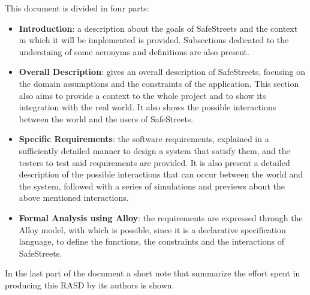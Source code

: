 This document is divided in four parts:
\begin{itemize}
	\item \textbf{Introduction}: a description about the goals of SafeStreets and the context in which it will be implemented is provided. Subsections dedicated to the understaing of some acronyms and definitions are also present. 
	
	\item \textbf{Overall Description}: gives an overall description of SafeStreets, focusing on the domain assumptions and the constraints of the application. This section also aims to provide a context to the whole project and to show its integration with the real world. It also shows the possible interactions between the world and the users of SafeStreets. 
	
	\item \textbf{Specific Requirements}: the software requirements, explained in a sufficiently detailed manner to design a system that satisfy them, and the testers to test said requirements are provided. It is also present a detailed description of the possible interactions that can occur between the world and the system, followed with a series of simulations and previews about the above mentioned interactions.
	
	\item \textbf{Formal Analysis using Alloy}: the requirements are expressed through the Alloy model, with which is possible, since it is a declarative specification language, to define the functions, the constraints and the interactions of SafeStreets.   
\end{itemize}
In the last part of the document a short note that summarize the effort spent in producing this RASD by its authors is shown.